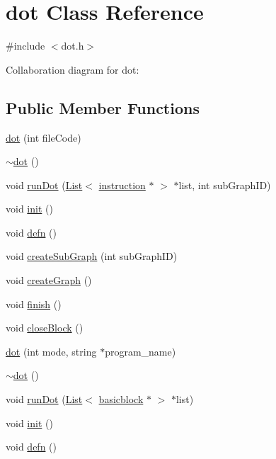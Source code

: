 \hypertarget{classdot}{
\section{dot Class Reference}
\label{classdot}
}


{\ttfamily \#include $<$dot.h$>$}



Collaboration diagram for dot:
\subsection*{Public Member Functions}
\begin{DoxyCompactItemize}
\item 
\hyperlink{classdot_afca1c1f39b692528483b78569751068a}{dot} (int fileCode)
\item 
\hyperlink{classdot_a7c31a26ba233474fd5c7857bd3d8158f}{$\sim$dot} ()
\item 
void \hyperlink{classdot_a23bb05ec40259de7239b166b664bfdb4}{runDot} (\hyperlink{classList}{List}$<$ \hyperlink{classinstruction}{instruction} $\ast$ $>$ $\ast$list, int subGraphID)
\item 
void \hyperlink{classdot_a5841f9acea9e636b9630e8a2ebe25382}{init} ()
\item 
void \hyperlink{classdot_a0f2386ca3194247a3e8cb8bf05749a5e}{defn} ()
\item 
void \hyperlink{classdot_a589a9b85d00d4072fd1eecf3b4b90bf0}{createSubGraph} (int subGraphID)
\item 
void \hyperlink{classdot_aac4be16ebdd60983177619a8b7df658f}{createGraph} ()
\item 
void \hyperlink{classdot_accd0278010df6b72404449831d51cd4e}{finish} ()
\item 
void \hyperlink{classdot_acc4e61396656da0a5a0ec085c88e414e}{closeBlock} ()
\item 
\hyperlink{classdot_af11dd579c7b133d259ac9fe60e7ae629}{dot} (int mode, string $\ast$program\_\-name)
\item 
\hyperlink{classdot_a7c31a26ba233474fd5c7857bd3d8158f}{$\sim$dot} ()
\item 
void \hyperlink{classdot_a613147e95e44f245a63a5b08418c95f9}{runDot} (\hyperlink{classList}{List}$<$ \hyperlink{classbasicblock}{basicblock} $\ast$ $>$ $\ast$list)
\item 
void \hyperlink{classdot_a5841f9acea9e636b9630e8a2ebe25382}{init} ()
\item 
void \hyperlink{classdot_a0f2386ca3194247a3e8cb8bf05749a5e}{defn} ()

\end{DoxyCompactItemize}
